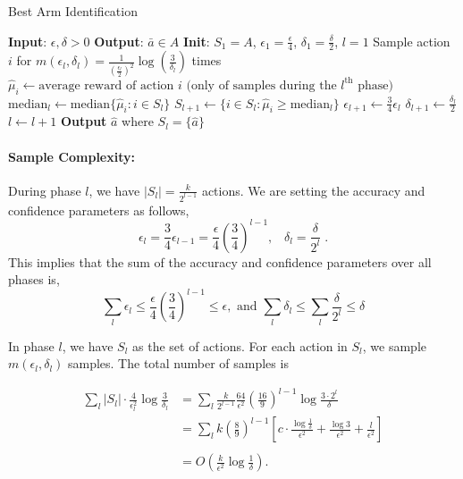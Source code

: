 \begin{algorithm}
\caption{Best Arm Identification}
\begin{algorithmic}[1]
\State \textbf{Input}: $\epsilon, \delta > 0$
\State \textbf{Output}: $\bar{a} \in A$
\State \textbf{Init}: $S_{1} = A$, $\epsilon_{1} = \frac{\epsilon}{4}$, $\delta_{1} = \frac{\delta}{2}$, $l = 1$
\Repeat
        \State Sample action $i$ for $m(\epsilon_l, \delta_l) = \frac{1}{\left(\frac{\epsilon_{l}}{2}\right)^2} \log \left(\frac{3}{\delta_{l}}\right)$ times
        \State $\hat{\mu}_{i} \leftarrow \text{average reward of action } i \text{ (only of samples during the } l^{\text{th}} \text{ phase)}$
    \EndFor
    \State $\text{median}_{l} \leftarrow \text{median} \{ \hat{\mu}_{i} : i \in S_{l} \}$
    \State $S_{l+1} \leftarrow \{ i \in S_{l} : \hat{\mu}_{i} \geq \text{median}_{l} \}$
    \State $\epsilon_{l+1} \leftarrow \frac{3}{4} \epsilon_{l}$
    \State $\delta_{l+1} \leftarrow \frac{\delta_{l}}{2}$
    \State $l \leftarrow l + 1$
\State \textbf{Output} $\hat{a}$ where $S_l = \{\hat{a}\}$
\end{algorithmic}
\end{algorithm}

\paragraph{Sample Complexity:}

During phase $l$, we have $\left|S_{l}\right|=\frac{k}{2^{l-1}}$
actions. We are setting the accuracy and confidence parameters as follows,
\[
\epsilon_{l}=\frac{3}{4}\epsilon_{l-1}=\frac{\epsilon}{4}\left(\frac{3}{4}\right)^{l-1},\;\;\;\delta_{l}=\frac{\delta}{2^{l}}\;.
\]
This implies that the sum of the accuracy and confidence parameters over all phases is,
\[
 \sum_l\epsilon_{l}\le\frac{\epsilon}{4}\left(\frac{3}{4}\right)^{l-1}\le \epsilon, \text{ and } \sum_l\delta_{l}\le\sum_l \frac{\delta}{2^{l}} \le\delta
\]

In phase $l$, we have $S_l$ as the set of actions. For each action in $S_l$, we sample $m(\epsilon_l,\delta_l)$ samples.
The total number of samples is

\begin{align*}
 \sum_l |S_l| \cdot \frac{4}{\epsilon_l^2}\log \frac{3}{\delta_l} &=
\sum_{l}\frac{k}{2^{l-1}}\frac{64}{\epsilon^{2}}\left(\frac{16}{9}\right)^{l-1}\log\frac{3\cdot2^{l}}{\delta}\\
& =  {\displaystyle \sum_{l}k\left(\frac{8}{9}\right)^{l-1}\left[c\cdot\frac{\log\frac{1}{\delta}}{\epsilon^{2}}+\frac{\log3}{\epsilon^{2}}+\frac{l}{\epsilon^{2}}\right]}\\
\\
 & =  O\left(\frac{k}{\epsilon^{2}}\log\frac{1}{\delta}\right).
\end{align*}


